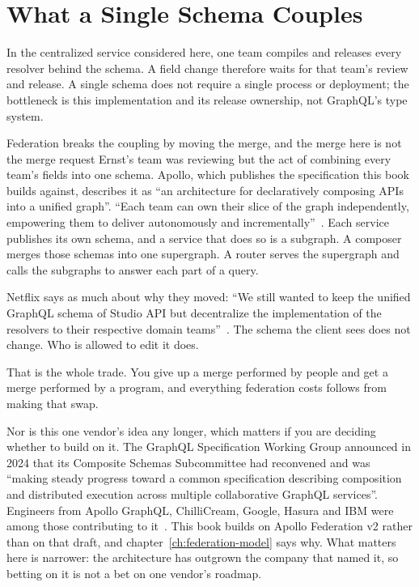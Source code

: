 \section{What a Single Schema Couples}
\label{sec:ch01-what-a-single-schema-couples}

In the centralized service considered here, one team compiles and releases
every resolver behind the schema. A field change therefore waits for that
team's review and release. A single schema does not require a single process
or deployment; the bottleneck is this implementation and its release ownership,
not GraphQL's type system.

%
Federation breaks the coupling by moving the merge, and the merge here is not
the merge request Ernst's team was reviewing but the act of combining every
team's fields into one schema. Apollo, which publishes the
specification this book builds against, describes it as \enquote{an
architecture for declaratively composing APIs into a unified graph}.
\enquote{Each team can own their slice of the graph independently, empowering
them to deliver autonomously and incrementally}~\autocite{apollofederation}.
%
%
%
Each service publishes its own schema, and a service that does so is a
subgraph. A composer merges those schemas into one supergraph. A router serves
the supergraph and calls the subgraphs to answer each part of a query.

Netflix says as much about why they moved: \enquote{We still wanted to keep the
unified GraphQL schema of Studio API but decentralize the implementation of the
resolvers to their respective domain teams}~\autocite{shikhare2020}. The schema
the client sees does not change. Who is allowed to edit it does.

That is the whole trade. You give up a merge performed by people and get a
merge performed by a program, and everything federation costs follows from
making that swap.

Nor is this one vendor's idea any longer, which matters if you are deciding
whether to build on it. The GraphQL Specification Working Group announced in
2024 that its Composite Schemas Subcommittee had reconvened and was
\enquote{making steady progress toward a common specification describing
composition and distributed execution across multiple collaborative GraphQL
services}. Engineers from Apollo GraphQL, ChilliCream, Google, Hasura and IBM
were among those contributing to it~\autocite{compositeschemas2024}. This book
builds on Apollo Federation v2 rather than on that draft, and
chapter~\ref{ch:federation-model} says why. What matters here is narrower: the
architecture has outgrown the company that named it, so betting on it is not a
bet on one vendor's roadmap.
